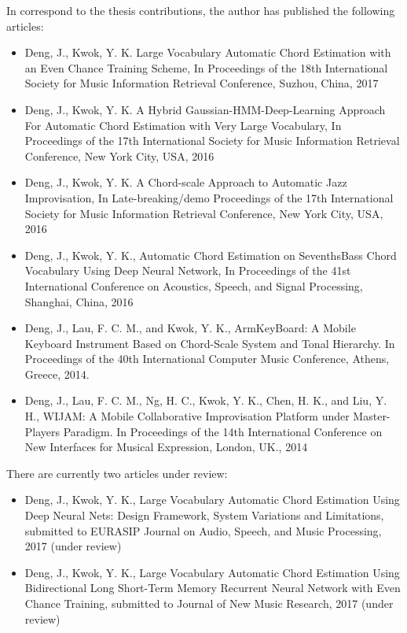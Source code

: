 In correspond to the thesis contributions, the author has published the following articles:
\begin{itemize}
\item Deng, J., Kwok, Y. K. Large Vocabulary Automatic Chord Estimation with an Even Chance Training Scheme, In Proceedings of the 18th International Society for Music Information Retrieval Conference, Suzhou, China, 2017
\item Deng, J., Kwok, Y. K. A Hybrid Gaussian-HMM-Deep-Learning Approach For Automatic Chord Estimation with Very Large Vocabulary, In Proceedings of the 17th International Society for Music Information Retrieval Conference, New York City, USA, 2016
\item Deng, J., Kwok, Y. K. A Chord-scale Approach to Automatic Jazz Improvisation, In Late-breaking/demo Proceedings of the 17th International Society for Music Information Retrieval Conference, New York City, USA, 2016
\item Deng, J., Kwok, Y. K., Automatic Chord Estimation on SeventhsBass Chord Vocabulary Using Deep Neural Network, In Proceedings of the 41st International Conference on Acoustics, Speech, and Signal Processing, Shanghai, China, 2016
\item Deng, J., Lau, F. C. M., and Kwok, Y. K., ArmKeyBoard: A Mobile Keyboard Instrument Based on Chord-Scale System and Tonal Hierarchy. In Proceedings of the 40th International Computer Music Conference, Athens, Greece, 2014.
\item Deng, J., Lau, F. C. M., Ng, H. C., Kwok, Y. K., Chen, H. K., and Liu, Y. H., WIJAM: A Mobile Collaborative Improvisation Platform under Master-Players Paradigm. In Proceedings of the 14th International Conference on New Interfaces for Musical Expression, London, UK., 2014
\end{itemize}

There are currently two articles under review:
\begin{itemize}
\item Deng, J., Kwok, Y. K., Large Vocabulary Automatic Chord Estimation Using Deep Neural Nets: Design Framework, System Variations and Limitations, submitted to EURASIP Journal on Audio, Speech, and Music Processing, 2017 (under review)
\item Deng, J., Kwok, Y. K., Large Vocabulary Automatic Chord Estimation Using Bidirectional Long Short-Term Memory Recurrent Neural Network with Even Chance Training, submitted to Journal of New Music Research, 2017 (under review)
\end{itemize}



